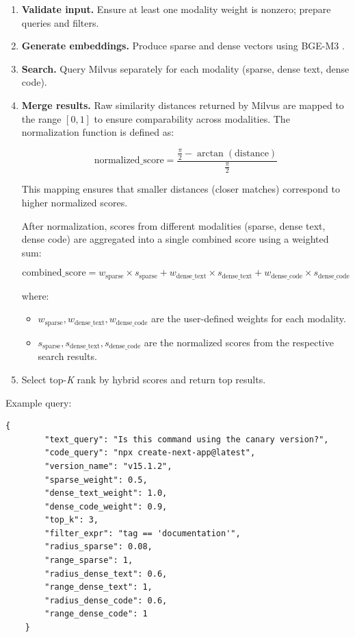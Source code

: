 \begin{enumerate}
	\item \textbf{Validate input.} Ensure at least one modality weight is nonzero; prepare queries and filters.
	\item \textbf{Generate embeddings.} Produce sparse and dense vectors using BGE-M3 \cite{chen2024bge}.
	\item \textbf{Search.} Query Milvus separately for each modality (sparse, dense text, dense code).
	\item \textbf{Merge results.} Raw similarity distances returned by Milvus are mapped to the range \([0, 1]\) to ensure comparability across modalities.  
	The normalization function is defined as:
	
	\[
	\text{normalized\_score} = \frac{\frac{\pi}{2} - \arctan(\text{distance})}{\frac{\pi}{2}}
	\]
	
	This mapping ensures that smaller distances (closer matches) correspond to higher normalized scores.
	
	After normalization, scores from different modalities (sparse, dense text, dense code) are aggregated into a single combined score using a weighted sum:
	
	\[
	\text{combined\_score} = w_{\text{sparse}} \times s_{\text{sparse}} + w_{\text{dense\_text}} \times s_{\text{dense\_text}} + w_{\text{dense\_code}} \times s_{\text{dense\_code}}
	\]
	
	where:
	\begin{itemize}
		\item \(w_{\text{sparse}}, w_{\text{dense\_text}}, w_{\text{dense\_code}}\) are the user-defined weights for each modality.
		\item \(s_{\text{sparse}}, s_{\text{dense\_text}}, s_{\text{dense\_code}}\) are the normalized scores from the respective search results.
	\end{itemize}
	
	\item Select top-\textit{K} rank by hybrid scores and return top results.
\end{enumerate}

Example query:

\begin{lstlisting}[caption=POST /search JSON payload example]
	{
		"text_query": "Is this command using the canary version?",
		"code_query": "npx create-next-app@latest",
		"version_name": "v15.1.2",
		"sparse_weight": 0.5,
		"dense_text_weight": 1.0,
		"dense_code_weight": 0.9,
		"top_k": 3,
		"filter_expr": "tag == 'documentation'",
		"radius_sparse": 0.08,
		"range_sparse": 1,
		"radius_dense_text": 0.6,
		"range_dense_text": 1,
		"radius_dense_code": 0.6,
		"range_dense_code": 1
	}
\end{lstlisting}

